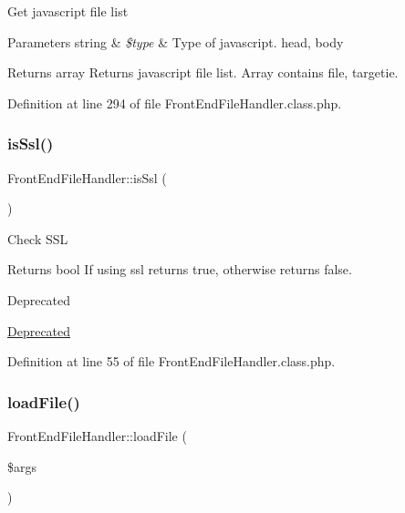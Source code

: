 Get javascript file list


\begin{DoxyParams}[1]{Parameters}
string & {\em \$type} & Type of javascript. head, body \\
\hline
\end{DoxyParams}
\begin{DoxyReturn}{Returns}
array Returns javascript file list. Array contains file, targetie. 
\end{DoxyReturn}


Definition at line 294 of file Front\+End\+File\+Handler.\+class.\+php.

\mbox{\label{classFrontEndFileHandler_a2bd70c621572f784c4e563d0dafa0fc2}} 
\subsubsection{\texorpdfstring{is\+Ssl()}{isSsl()}}
{\footnotesize\ttfamily Front\+End\+File\+Handler\+::is\+Ssl (\begin{DoxyParamCaption}{ }\end{DoxyParamCaption})}

Check S\+SL

\begin{DoxyReturn}{Returns}
bool If using ssl returns true, otherwise returns false. 
\end{DoxyReturn}
\begin{DoxyRefDesc}{Deprecated}
\item[\hyperlink{deprecated__deprecated000009}{Deprecated}]\end{DoxyRefDesc}


Definition at line 55 of file Front\+End\+File\+Handler.\+class.\+php.

\mbox{\label{classFrontEndFileHandler_aeb802ae7b7b315da73ec3be224ce9e9f}} 
\subsubsection{\texorpdfstring{load\+File()}{loadFile()}}
{\footnotesize\ttfamily Front\+End\+File\+Handler\+::load\+File (\begin{DoxyParamCaption}\item[{}]{\$args }\end{DoxyParamCaption})}

